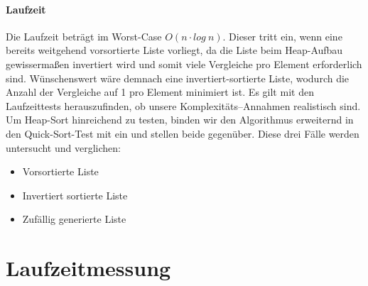\documentclass[11pt]{article}
\begin{document}
    \paragraph{Laufzeit}\label{subsec:Hlaufzeit}
    Die Laufzeit beträgt im Worst-Case \(O(n\cdot log\ n)\). Dieser tritt
    ein, wenn eine bereits weitgehend vorsortierte Liste vorliegt, da die
    Liste beim Heap-Aufbau gewissermaßen invertiert wird und somit viele
    Vergleiche pro Element erforderlich sind.
    Wünschenswert wäre demnach eine invertiert-sortierte Liste, wodurch die
    Anzahl der Vergleiche auf 1 pro Element minimiert ist.
    Es gilt mit den Laufzeittests herauszufinden, ob unsere
    Komplexitäts--Annahmen realistisch sind.
    Um Heap-Sort hinreichend zu testen, binden wir den Algorithmus erweiternd
    in den Quick-Sort-Test mit ein und stellen beide gegenüber.
    Diese drei Fälle werden untersucht und verglichen:
    \begin{samepage}
        \begin{itemize}
            \item Vorsortierte Liste
            \item Invertiert sortierte Liste
            \item Zufällig generierte Liste
        \end{itemize}
    \end{samepage}

    \section{Laufzeitmessung}\label{sec:laufzeitmessung}
\end{document}

